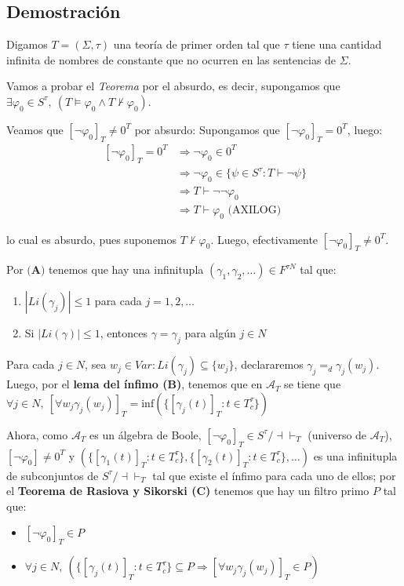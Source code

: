 \documentclass{article}
\begin{document}
\subsection*{Demostración}
Digamos $T=(\Sigma,\tau)$ una teoría de primer orden tal que $\tau$ tiene una cantidad infinita de nombres de constante que no ocurren en las sentencias de $\Sigma$.

Vamos a probar el \textit{Teorema} por el absurdo, es decir, supongamos que $\exists\varphi_0\in S^\tau,\ (T\vDash\varphi_0\land T\nvdash\varphi_0)$.

\vspace{0.3cm}
Veamos que $[\neg\varphi_0]_T\neq 0^T$ por absurdo: Supongamos que $[\neg\varphi_0]_T=0^T$, luego:
\begin{equation*}
  \begin{aligned}
    \ [\neg\varphi_0]_T=0^T & \Rightarrow \neg\varphi_0\in 0^T                              \\
                            & \Rightarrow\neg\varphi_0\in\{\psi\in S^\tau:T\vdash\neg\psi\} \\
                            & \Rightarrow T\vdash\neg\neg\varphi_0                          \\
                            & \Rightarrow T\vdash\varphi_0\text{ (AXILOG)}
  \end{aligned}
\end{equation*}

lo cual es absurdo, pues suponemos $T\nvdash\varphi_0$. Luego, efectivamente $[\neg\varphi_0]_T\neq 0^T$.

\vspace{0.3cm}
Por $\textbf{(A)}$ tenemos que hay una infinitupla $(\gamma_1,\gamma_2,\dots)\in F^{\tau N}$ tal que:
\begin{enumerate}
  \item $|Li(\gamma_j)|\leq 1$ para cada $j=1,2,\dots$
  \item Si $|Li(\gamma)|\leq 1$, entonces $\gamma=\gamma_j$ para algún $j\in N$
\end{enumerate}

Para cada $j\in N$, sea $w_j\in Var:Li(\gamma_j)\subseteq\{w_j\}$, declararemos $\gamma_j=_d\gamma_j(w_j)$. Luego, por el \textbf{lema del ínfimo (B)}, tenemos que en $\mathcal{A}_T$ se tiene que $\forall j\in N,\ [\forall w_j\gamma_j(w_j)]_T=\text{inf}(\{[\gamma_j(t)]_T:t\in T^\tau_c\})$

Ahora, como $\mathcal{A}_T$ es un álgebra de Boole, $[\neg\varphi_0]_T\in S^\tau/\dashv\vdash_T$ (universo de $\mathcal{A}_T$), $[\neg\varphi_0]\neq 0^T$ y $(\{[\gamma_1(t)]_T:t\in T^\tau_c\},\{[\gamma_2(t)]_T:t\in T^\tau_c\},\dots)$ es una infinitupla de subconjuntos de $S^\tau/\dashv\vdash_T$ tal que existe el ínfimo para cada uno de ellos; por el \textbf{Teorema de Rasiova y Sikorski (C)} tenemos que hay un filtro primo $P$ tal que:
\begin{itemize}
  \item $[\neg\varphi_0]_T\in P$
  \item $\forall j\in N,\ (\{[\gamma_j(t)]_T:t\in T^\tau_c\}\subseteq P\Rightarrow [\forall w_j\gamma_j(w_j)]_T\in P)$
\end{itemize}
\end{document}
